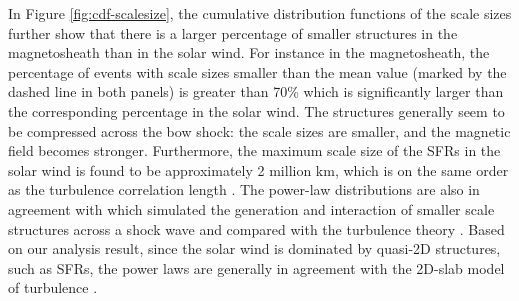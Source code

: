 In Figure \ref{fig:cdf-scalesize}, the cumulative distribution functions of the scale sizes further show that there is a larger percentage of smaller structures in the magnetosheath than in the solar wind. For instance in the magnetosheath, the percentage of events with scale sizes smaller than the mean value (marked by the dashed line in both panels) is greater than 70\% which is significantly larger than the corresponding percentage in the solar wind. The structures generally seem to be compressed across the bow shock: the scale sizes are smaller, and the magnetic field becomes stronger. Furthermore, the maximum scale size of the SFRs in the solar wind is found to be approximately 2 million km, which is on the same order as the turbulence correlation length \citep{Horbury:1996}. The power-law distributions are also in agreement with \cite{Nakanotani:2022, Nakanotani2:2022} which simulated the generation and interaction of smaller scale structures across a shock wave and compared with the turbulence theory \citep{Zank:2021, Zank:2017}. Based on our analysis result, since the solar wind is dominated by quasi-2D structures, such as SFRs, the power laws are generally in agreement with the 2D-slab model of turbulence \citep{Zank:2021, Zank:2017}.